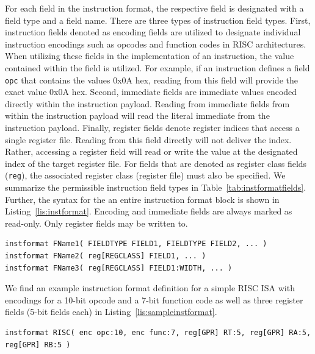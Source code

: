 \documentclass{article}
\begin{document}
For each field in the instruction format, the respective field is designated with a field type and a field name.  There are 
three types of instruction field types.  First, instruction fields denoted as encoding fields are utilized to designate 
individual instruction encodings such as opcodes and function codes in RISC architectures.  When utilizing these fields 
in the implementation of an instruction, the value contained within the field is utilized.  For example, if an instruction 
defines a field \texttt{opc} that contains the values 0x0A hex, reading from this field will provide the exact value 0x0A hex.  
Second, immediate fields are immediate values encoded directly within the instruction payload.  Reading from immediate 
fields from within the instruction payload will read the literal immediate from the instruction payload.  Finally, register fields 
denote register indices that access a single register file.  Reading from this field directly will not deliver the index.  Rather, accessing 
a register field will read or write the value at the designated index of the target register file.    
For fields that are denoted as register class fields (\texttt{reg}), the associated register class (register file) must also be specified.  
We summarize the permissible instruction field types in Table~\ref{tab:instformatfields}.  Further, the syntax for the an entire instruction 
format block is shown in Listing~\ref{lis:instformat}.  Encoding and immediate fields are always marked as read-only.  Only 
register fields may be written to.  

\vspace{0.125in}
\begin{lstlisting}[frame=single,style=base,caption={Instruction Format Definition Syntax},captionpos=b,label={lis:instformat}]
instformat FName1( FIELDTYPE FIELD1, FIELDTYPE FIELD2, ... )
instformat FName2( reg[REGCLASS] FIELD1, ... )
instformat FName3( reg[REGCLASS] FIELD1:WIDTH, ... )
\end{lstlisting}

We find an example instruction format definition for a simple RISC ISA with encodings for a 10-bit opcode and a 7-bit function code 
as well as three register fields (5-bit fields each) in Listing~\ref{lis:sampleinstformat}.  

\vspace{0.125in}
\begin{lstlisting}[frame=single,style=base,caption={Sample Instruction Format Definition},captionpos=b,label={lis:sampleinstformat}]
instformat RISC( enc opc:10, enc func:7, reg[GPR] RT:5, reg[GPR] RA:5, reg[GPR] RB:5 )
\end{lstlisting}
\end{document}
